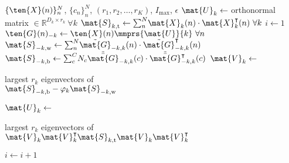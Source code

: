 \begin{algorithmic}[1]
  \Require $\{\ten{X}(n)\}_n^N$, $\{c_n\}_n^N$,
  $(r_1,r_2,\ldots,r_K)$, $I_\text{max}$, $\epsilon$
  \State $\mat{U}_k \gets $ orthonormal matrix $\in \mathbb{R}^{D_k\times r_k}
  \ \forall k$
  \State $\mat{S}_{k,\text{t}} \gets
  \textstyle{\sum_n^N}\mat{X}_k(n)\cdot\mat{X}_k^\intercal(n)\ \forall k$
  \State $i\gets 1$
  \Repeat
  \State $\ten{G}(n)_{-k} \gets \ten{X}(n)\mmprs{\mat{U}}{k} \ \forall n$
  \State $\mat{S}_{-k,\text{w}} \gets
  \textstyle{\sum_n^N}\tilde{\mat{G}}_{-k,k}(n)\cdot\tilde{\mat{G}}_{-k,k}^\intercal(n)$
  \State $\mat{S}_{-k,\text{b}} \gets
  \textstyle{\sum_c^C}N_c\tilde{\bar{\mat{G}}}_{-k,k}(c)\cdot\tilde{\bar{\mat{G}}}_{-k,k}^\intercal(c)$
  \State $\mat{V}_k\gets$ \parbox[t]{5cm}{largest $r_k$ eigenvectors of \\
  $\mat{S}_{-k,\text{b}} - \varphi_k\mat{S}_{-k,\text{w}}$}
  \State $\mat{U}_k \gets$ \parbox[t]{5cm}{largest $r_k$ eigenvectors of \\
  $\mat{V}_k\mat{V}_k^\intercal\mat{S}_{k,\text{t}}\mat{V}_k\mat{V}_k^\intercal$}
  \EndFor
  \State $i\gets i+1$
\end{algorithmic}
